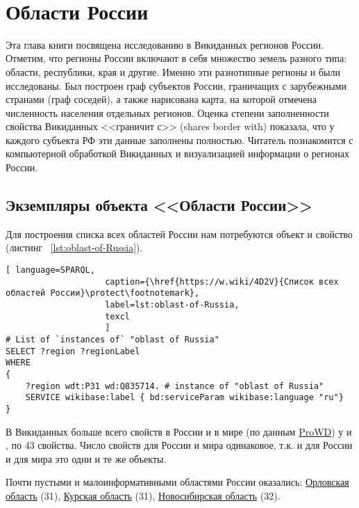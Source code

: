 ﻿﻿\chapter{Области России}
\label{ch:oblast-of-Russia}
Эта глава книги посвящена исследованию в Викиданных регионов России. 
Отметим, что регионы России включают в себя множество земель разного 
типа: области, республики, края и другие. Именно эти разнотипные регионы 
и были исследованы. Был построен граф субъектов России, граничащих 
с зарубежными странами (граф соседей), а также нарисована карта, 
на которой отмечена численность населения отдельных регионов. Оценка 
степени заполненности свойства Викиданных <<граничит с>> (shares border with) 
показала, что у каждого субъекта РФ эти данные заполнены полностью. 
Читатель познакомится с компьютерной обработкой Викиданных и визуализацией 
информации о регионах России.

\section{Экземпляры объекта <<Области России>>}

Для построения списка всех областей России нам потребуются объект 
 и свойство  
(листинг ~\protect\ref{lst:oblast-of-Russia}).

\begin{lstlisting}[ language=SPARQL, 
                    caption={\href{https://w.wiki/4D2V}{Список всех областей России}\protect\footnotemark},
                    label=lst:oblast-of-Russia,
                    texcl 
                    ]
# List of `instances of` "oblast of Russia"
SELECT ?region ?regionLabel
WHERE
{
    ?region wdt:P31 wd:Q835714. # instance of "oblast of Russia"
    SERVICE wikibase:label { bd:serviceParam wikibase:language "ru"}
}
\end{lstlisting}%

В Викиданных больше всего свойств в России и в мире (по данным \href{https://prowd.id/dashboards/68f1cfd5b84d/profile}{ProWD}) у  и , по 43 свойства. Число свойств для России и мира одинаковое, т.к. и для России и для мира это одни и те же объекты.

Почти пустыми и малоинформативными областями России оказались: \href{http://www.wikidata.org/entity/Q3129}{Орловская область} (\num{31}), \href{http://www.wikidata.org/entity/Q3178}{Курская область} (\num{31}), \href{http://www.wikidata.org/entity/Q5851}{Новосибирская область} (\num{32}).\protect\footnotemark

